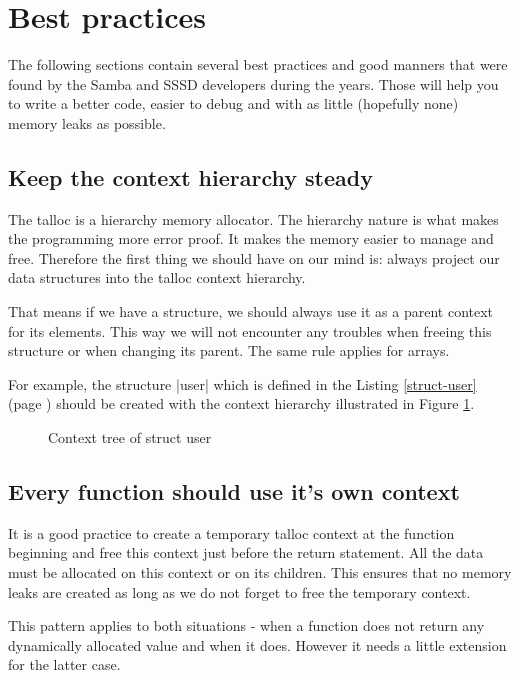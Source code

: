\section{Best practices}
\label{talloc:sec:best-practices}

The following sections contain several best practices and good manners that were
found by the Samba and SSSD developers during the years. Those will help you to
write a better code, easier to debug and with as little (hopefully none) memory
leaks as possible.

\subsection{Keep the context hierarchy steady}

The talloc is a hierarchy memory allocator. The hierarchy nature is what makes
the programming more error proof. It makes the memory easier to manage and free.
Therefore the first thing we should have on our mind is: always project our data
structures into the talloc context hierarchy.

That means if we have a structure, we should always use it as a parent context
for its elements. This way we will not encounter any troubles when freeing this
structure or when changing its parent. The same rule applies for arrays.

For example, the structure |user| which is defined in the Listing
\ref{struct-user} (page \pageref{struct-user}) should be created with the
context hierarchy illustrated in Figure \ref{fig:bp-context-tree}.

\begin{figure}[H]
  \centering
  
  \caption{Context tree of struct user}
  \label{fig:bp-context-tree}
\end{figure}

\subsection{Every function should use it's own context}
\label{talloc:subsec:function-use-own-context}

It is a good practice to create a temporary talloc context at the function
beginning and free this context just before the return statement. All the data
must be allocated on this context or on its children. This ensures that no
memory leaks are created as long as we do not forget to free the temporary
context.

This pattern applies to both situations - when a function does not return any
dynamically allocated value and when it does. However it needs a little
extension for the latter case.

